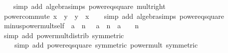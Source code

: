 \begin{isabellebody}
%
\isadelimproof
\ \ %
\endisadelimproof
%
\isatagproof
{}\isamarkupfalse%
\ {\isacharparenleft}{\kern0pt}simp\ add{\isacharcolon}{\kern0pt}\ algebra{\isacharunderscore}{\kern0pt}simps\ power{}{\isacharunderscore}{\kern0pt}eq{\isacharunderscore}{\kern0pt}square\ mult{\isacharunderscore}{\kern0pt}{}{\isacharunderscore}{\kern0pt}right{\isacharparenright}{\kern0pt}%
\endisatagproof
{\isafoldproof}%
%
\isadelimproof
\isanewline
%
\endisadelimproof
\isanewline
{}\isamarkupfalse%
\ power{}{\isacharunderscore}{\kern0pt}commute{\isacharcolon}{\kern0pt}\ {\isachardoublequoteopen}{\isacharparenleft}{\kern0pt}x\ {\isacharminus}{\kern0pt}\ y{\isacharparenright}{\kern0pt}\ {\isacharequal}{\kern0pt}\ {\isacharparenleft}{\kern0pt}y\ {\isacharminus}{\kern0pt}\ x{\isacharparenright}{\kern0pt}\isanewline
%
\isadelimproof
\ \ %
\endisadelimproof
%
\isatagproof
{}\isamarkupfalse%
\ {\isacharparenleft}{\kern0pt}simp\ add{\isacharcolon}{\kern0pt}\ algebra{\isacharunderscore}{\kern0pt}simps\ power{}{\isacharunderscore}{\kern0pt}eq{\isacharunderscore}{\kern0pt}square{\isacharparenright}{\kern0pt}%
\endisatagproof
{\isafoldproof}%
%
\isadelimproof
\isanewline
%
\endisadelimproof
\isanewline
{}\isamarkupfalse%
\ minus{\isacharunderscore}{\kern0pt}power{\isacharunderscore}{\kern0pt}mult{\isacharunderscore}{\kern0pt}self{\isacharcolon}{\kern0pt}\ {\isachardoublequoteopen}{\isacharparenleft}{\kern0pt}{\isacharminus}{\kern0pt}\ a{\isacharparenright}{\kern0pt}\ {\isacharcircum}{\kern0pt}\ n\ {\isacharasterisk}{\kern0pt}\ {\isacharparenleft}{\kern0pt}{\isacharminus}{\kern0pt}\ a{\isacharparenright}{\kern0pt}\ {\isacharcircum}{\kern0pt}\ n\ {\isacharequal}{\kern0pt}\ a\ {\isacharcircum}{\kern0pt}\ {\isacharparenleft}{\kern0pt}{}\ {\isacharasterisk}{\kern0pt}\ n{\isacharparenright}{\kern0pt}{\isachardoublequoteclose}\isanewline
%
\isadelimproof
\ \ %
\endisadelimproof
%
\isatagproof
{}\isamarkupfalse%
\ {\isacharparenleft}{\kern0pt}simp\ add{\isacharcolon}{\kern0pt}\ power{\isacharunderscore}{\kern0pt}mult{\isacharunderscore}{\kern0pt}distrib\ {\isacharbrackleft}{\kern0pt}symmetric{\isacharbrackright}{\kern0pt}{\isacharparenright}{\kern0pt}\isanewline
\ \ \ \ {\isacharparenleft}{\kern0pt}simp\ add{\isacharcolon}{\kern0pt}\ power{}{\isacharunderscore}{\kern0pt}eq{\isacharunderscore}{\kern0pt}square\ {\isacharbrackleft}{\kern0pt}symmetric{\isacharbrackright}{\kern0pt}\ power{\isacharunderscore}{\kern0pt}mult\ {\isacharbrackleft}{\kern0pt}symmetric{\isacharbrackright}{\kern0pt}{\isacharparenright}{\kern0pt}%

\end{isabellebody}
